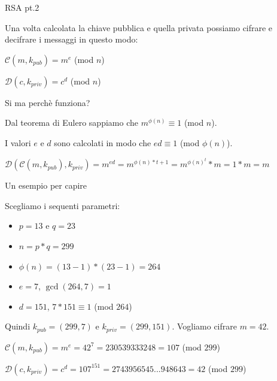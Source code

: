 \documentclass[xcolor=dvipsnames,aspectratio=169]{beamer}
\begin{document}
\begin{frame}{RSA pt.2}

Una volta calcolata la chiave pubblica e quella privata possiamo cifrare e decifrare i messaggi in questo modo:

\pause
\medskip

$\mathcal{C}(m, k_{pub}) = m^{e} $ (mod $n$) \pause
  
$\mathcal{D}(c, k_{priv}) = c^{d} $ (mod $n$)

\medskip

\pause

Si ma perchè funziona?

\medskip

\pause

Dal teorema di Eulero sappiamo che $m^{\phi(n)} \equiv 1 $ (mod $n$).

I valori $e$ e $d$ sono calcolati in modo che $ed \equiv 1$ (mod $\phi(n)$).

\medskip

$\mathcal{D}(\mathcal{C}(m, k_{pub}), k_{priv}) = m^{ed} = m^{\phi(n)*t + 1} = m^{\phi(n)^{t}} * m = 1 * m = m$

\end{frame}

\begin{frame}{Un esempio per capire}
  
\pause

  Scegliamo i sequenti parametri:
  
  \begin{itemize}
    \item $p = 13$ e $q = 23$
    \item $n = p*q = 299$
    \item $\phi(n) = (13-1)*(23-1) = 264$
    \item $e = 7$, $\gcd(264, 7) = 1$
    \item $d = 151$, $7*151 \equiv 1 $ (mod $264$)
  \end{itemize}
  
  \smallskip
  
\pause

  Quindi $k_{pub} = (299, 7)$ e $k_{priv} = (299, 151)$. Vogliamo cifrare $m = 42$.
  
\pause

  \medskip
  
  $\mathcal{C}(m, k_{pub}) = m^{e} = 42^7 = 230539333248 = 107$ (mod $299$) 
 
 \pause
  
  $\mathcal{D}(c, k_{priv}) = c^{d} = 107^{151} = 2743956545...948643 = 42 $ (mod $299$)

\end{frame}
\end{document}
